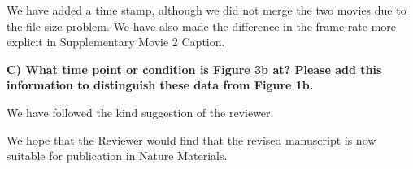 \documentclass[11pt,a4paper]{article}
\newenvironment{referee}%
{\bigskip\singlespacing\bf}%
{\par\bigskip}
\begin{document}
We have added a time stamp, although we did not merge the two movies due to the file size problem.  
We have also made the difference in the frame rate more explicit in Supplementary Movie 2 Caption. 


\begin{referee}
C) What time point or condition is Figure 3b at? Please add this information to distinguish these data from Figure 1b.
\end{referee}

We have followed the kind suggestion of the reviewer. 

\vspace{1cm}

We hope that the Reviewer would find that the revised manuscript is now suitable for publication in Nature Materials. 
\end{document}
